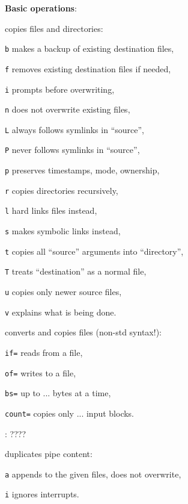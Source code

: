 \textbf{Basic operations}:
\begin{compactenum}
	\item [\symbolcoreutils]  copies files and directories:
	\item [\texttt{b}] makes a backup of existing destination files,
	\item [\texttt{f}] removes existing destination files if needed,
	\item [\texttt{i}] prompts before overwriting,
	\item [\texttt{n}] does not overwrite existing files,
	\item [\texttt{L}] always follows symlinks in ``source'',
	\item [\texttt{P}] never follows symlinks in ``source'',
	\item [\texttt{p}] preserves timestamps, mode, ownership,
	\item [\texttt{r}] copies directories recursively,
	\item [\texttt{l}] hard links files instead,
	\item [\texttt{s}] makes symbolic links instead,
	\item [\texttt{t}] copies all ``source'' arguments into ``directory'',
	\item [\texttt{T}] treats ``destination'' as a normal file,
	\item [\texttt{u}] copies only newer source files,
	\item [\texttt{v}] explains what is being done.

	\item [\symbolcoreutils]  converts and copies files (non-std syntax!):
	\item [] \texttt{if=} reads from a file,
	\item [] \texttt{of=} writes to a file,
	\item [] \texttt{bs=} up to ... bytes at a time,
	\item [] \texttt{count=} copies only ... input blocks.

	\item [\symbolcoreutils] : \dotfill ????

	\item [\symbolcoreutils]  duplicates pipe content: %
	\item [\texttt{a}] appends to the given files, does not overwrite,
	\item [\texttt{i}] ignores interrupts.
	

\end{compactenum}
